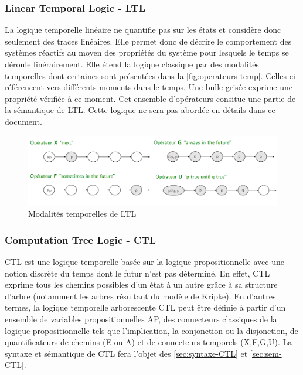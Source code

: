 \documentclass[runningheads,a4paper,10pt]{llncs}
\begin{document}
\subsubsection{Linear Temporal Logic - LTL}
La logique temporelle linéaire ne quantifie pas sur les états et considère donc seulement des traces linéaires. Elle permet donc de décrire le comportement des systèmes réactifs au moyen des propriétés du système pour lesquels le temps se déroule linérairement. Elle étend la logique classique par des modalités temporelles dont certaines sont présentées dans la \autoref{fig:operateurs-temp}. Celles-ci référencent vers différents moments dans le temps. Une bulle grisée exprime une propriété vérifiée à ce moment. Cet ensemble d'opérateurs consitue une partie de la sémantique de LTL. Cette logique ne sera pas abordée en détails dans ce document.

\begin{figure}
  \centering
   \includegraphics[scale=0.43]{figures/operateurs-temp.png}
   \caption[Caption for LOF]{Modalités temporelles de LTL \cite{bardin-slides}}
   \label{fig:operateurs-temp}
\end{figure} 

\subsubsection{Computation Tree Logic - CTL}
CTL est une logique temporelle basée sur la logique propositionnelle avec une notion discrète du temps dont le futur n'est pas déterminé. En effet, CTL exprime tous les chemins possibles d'un état à un autre grâce à sa structure d'arbre (notamment les arbres résultant du modèle de Kripke). En d'autres termes, la logique temporelle arborescente CTL peut être définie à partir d’un ensemble de variables propositionnelles AP, des connecteurs classiques de la logique propositionnelle tels que l'implication, la conjonction ou la disjonction, de quantificateurs de chemins (E ou A) et de connecteurs temporels (X,F,G,U). La syntaxe et sémantique de CTL fera l'objet des \autoref{sec:syntaxe-CTL} et \autoref{sec:sem-CTL}. \\
\end{document}

